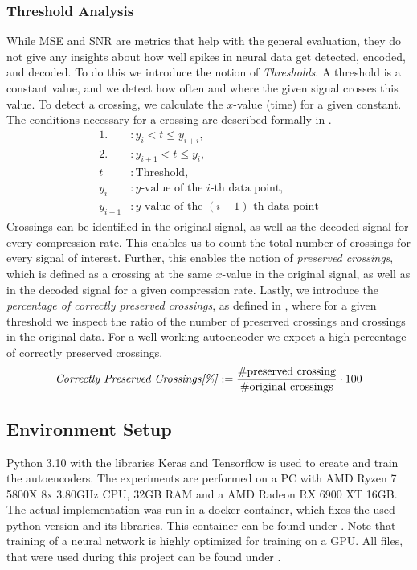 \subsubsection{Threshold Analysis} \label{sec:thresholdAnalysis}
While MSE and SNR are metrics that help with the general evaluation, they do not give any insights about how well spikes in neural data get detected, encoded, and decoded.
To do this we introduce the notion of \textit{Thresholds}. 
A threshold is a constant value, and we detect how often and where the given signal crosses this value.
To detect a crossing, we calculate the $x$-value (time) for a given constant. 
The conditions necessary for a crossing are described formally in .
\begin{equation}
	\begin{split}
		\text{1. } &: y_i < t \leq y_{i+i}, \\
		\text{2. } &: y_{i+1} < t \leq y_i, \\
		t &: \text{Threshold}, \\
		y_i &: \text{$y$-value of the $i$-th data point}, \\
		y_{i+1} &: \text{$y$-value of the $(i+1)$-th data point}
	\end{split}
	\label{eq:crossingCondition}
\end{equation}
Crossings can be identified in the original signal, as well as the decoded signal for every compression rate.
This enables us to count the total number of crossings for every signal of interest. 
Further, this enables the notion of \textit{preserved crossings}, which is defined as a crossing at the same $x$-value in the original signal, as well as in the decoded signal for a given compression rate.
Lastly, we introduce the \textit{percentage of correctly preserved crossings}, as defined in , where for a given threshold we inspect the ratio of the number of preserved crossings and crossings in the original data.
For a well working autoencoder we expect a high percentage of correctly preserved crossings.
\begin{equation}
	\text{\textit{Correctly Preserved Crossings[\%]}} := \frac{\text{\#preserved crossing}}{\text{\#original crossings}} \cdot 100
	\label{eq:percCorrectlyPreservedCrossings}
\end{equation}
\subsection{Environment Setup} \label{sec:EnvironmentSetup}
Python 3.10 with the libraries Keras \cite{chollet2015keras} and Tensorflow \cite{tensorflow2015-whitepaper} is used to create and train the autoencoders.
The experiments are performed on a PC with AMD Ryzen 7 5800X 8x 3.80GHz CPU, 32GB RAM and a AMD Radeon RX 6900 XT 16GB.
The actual implementation was run in a docker container, which fixes the used python version and its libraries. This container can be found under \cite{amdDevContainer}.
Note that training of a neural network is highly optimized for training on a GPU.
All files, that were used during this project can be found under \cite{gitlabrepo}.